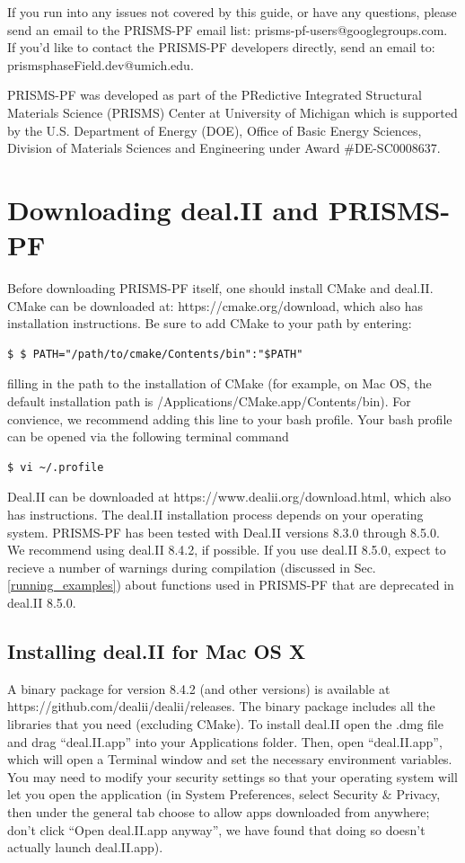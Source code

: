 \documentclass[10pt]{article} %
\begin{document}
If you run into any issues not covered by this guide, or have any questions, please send an email to the PRISMS-PF email list: prisms-pf-users@googlegroups.com. If you'd like to contact the PRISMS-PF developers directly, send an email to: prismsphaseField.dev@umich.edu.

PRISMS-PF was developed as part of the PRedictive Integrated Structural Materials Science (PRISMS) Center at University of Michigan which is supported by the U.S. Department of Energy (DOE), Office of Basic Energy Sciences, Division of Materials Sciences and Engineering under Award \#DE-SC0008637.

\section{Downloading deal.II and PRISMS-PF}

Before downloading PRISMS-PF itself, one should install CMake and deal.II. CMake can be downloaded at: https://cmake.org/download, which also has installation instructions. Be sure to add CMake to your path by entering:
\begin{lstlisting}
$ $ PATH="/path/to/cmake/Contents/bin":"$PATH"
\end{lstlisting}
filling in the path to the installation of CMake (for example, on Mac OS, the default installation path is /Applications/CMake.app/Contents/bin). For convience, we recommend adding this line to your bash profile. Your bash profile can be opened via the following terminal command
\begin{lstlisting}
$ vi ~/.profile
\end{lstlisting}

Deal.II can be downloaded at https://www.dealii.org/download.html, which also has instructions. The deal.II installation process depends on your operating system. PRISMS-PF has been tested with Deal.II versions 8.3.0 through 8.5.0. We recommend using deal.II 8.4.2, if possible. If you use deal.II 8.5.0, expect to recieve a number of warnings during compilation (discussed in Sec. \ref{running_examples}) about functions used in PRISMS-PF that are deprecated in deal.II 8.5.0.

\subsection{Installing deal.II for Mac OS X}
A binary package for version 8.4.2 (and other versions) is available at https://github.com/dealii/dealii/releases. The binary package includes all the libraries that you need (excluding CMake). To install deal.II open the .dmg file and drag ``deal.II.app'' into your Applications folder. Then, open ``deal.II.app'', which will open a Terminal window and set the necessary environment variables. You may need to modify your security settings so that your operating system will let you open the application (in System Preferences, select Security $\&$ Privacy, then under the general tab choose to allow apps downloaded from anywhere; don't click ``Open deal.II.app anyway'', we have found that doing so doesn't actually launch deal.II.app). 
\end{document}
